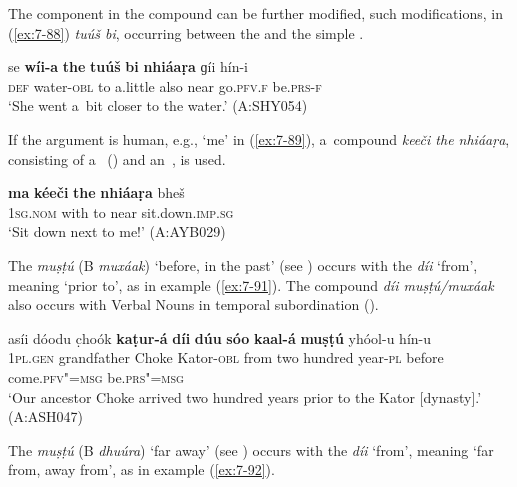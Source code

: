 \begin{exe}
The  component in the compound can be further modified, such modifications, in (\ref{ex:7-88}) \textit{tuúš bi}, occurring between the  and the simple .

\begin{exe}
\ex
\label{ex:7-88}
\gll se \textbf{wíi-a} \textbf{the} \textbf{tuúš} \textbf{bi} \textbf{nhiáaṛa} ɡíi hín-i \\
\textsc{def} water-\textsc{obl} to a.little also near go.\textsc{pfv.f} be.\textsc{prs-f} \\
\glt `She went a~bit closer to the water.' (A:SHY054)
\end{exe}

If the argument is human, e.g., `me' in (\ref{ex:7-89}), a~compound \textit{keeči the nhiáaṛa}, consisting of a~ () and an~, is used.

\begin{exe}
\ex
\label{ex:7-89}
\gll \textbf{ma} \textbf{kéeči} \textbf{the} \textbf{nhiáaṛa} bheš \\
\textsc{1sg.nom} with to near sit.down.\textsc{imp.sg} \\
\glt `Sit down next to me!' (A:AYB029)
\end{exe}


The  \textit{muṣṭú} (B \textit{muxáak}) `before, in the past' (see ) occurs with the  \textit{díi} `from', meaning `prior to', as in example (\ref{ex:7-91}). The compound \textit{díi muṣṭú/muxáak} also occurs with Verbal Nouns in temporal subordination (). 

\begin{exe}
\ex
\label{ex:7-91}
\gll asíi dóodu c̣hoók \textbf{kaṭur-á} \textbf{díi} \textbf{dúu} \textbf{sóo} \textbf{kaal-á} \textbf{muṣṭú} yhóol-u hín-u\\
\textsc{1pl.gen} grandfather Choke Kator-\textsc{obl} from two hundred year-\textsc{pl} before come.\textsc{pfv"=msg} be.\textsc{prs"=msg}\\
\glt `Our ancestor Choke arrived two hundred years prior to the Kator [dynasty].' (A:ASH047)
\end{exe}


 The  \textit{muṣṭú} (B \textit{dhuúra}) `far away' (see ) occurs with the  \textit{díi} `from', meaning `far from, away from', as in example (\ref{ex:7-92}). 


\end{exe}
